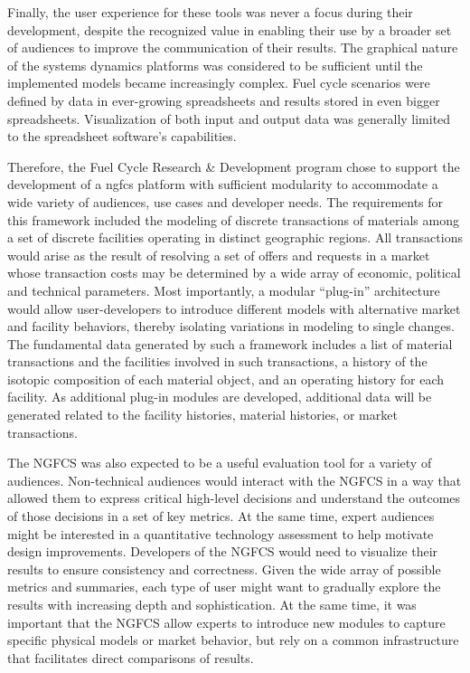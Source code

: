 Finally, the user experience for these tools was never a focus during their
development, despite the recognized value in enabling their use by a broader
set of audiences to improve the communication of their results.  The graphical
nature of the systems dynamics platforms was considered to be sufficient until
the implemented models became increasingly complex.  Fuel cycle scenarios were
defined by data in ever-growing spreadsheets and results stored in even bigger
spreadsheets.  Visualization of both input and output data was generally
limited to the spreadsheet software's capabilities.

Therefore, the Fuel Cycle Research \& Development program chose to support the
development of a \gls{ngfcs} platform with sufficient modularity to
accommodate a wide variety of audiences, use cases and developer needs. The
requirements for this framework included the modeling of discrete transactions
of materials among a set of discrete facilities operating in distinct
geographic regions. All transactions would arise as the result of resolving a
set of offers and requests in a market whose transaction costs may be
determined by a wide array of economic, political and technical
parameters. Most importantly, a modular “plug-in” architecture would allow
user-developers to introduce different models with alternative market and
facility behaviors, thereby isolating variations in modeling to single
changes. The fundamental data generated by such a framework includes a list of
material transactions and the facilities involved in such transactions, a
history of the isotopic composition of each material object, and an operating
history for each facility. As additional plug-in modules are developed,
additional data will be generated related to the facility histories, material
histories, or market transactions.

The NGFCS was also expected to be a useful evaluation tool for a variety of
audiences.  Non-technical audiences would interact with the NGFCS in a way
that allowed them to express critical high-level decisions and understand the
outcomes of those decisions in a set of key metrics. At the same time, expert
audiences might be interested in a quantitative technology assessment to help
motivate design improvements. Developers of the NGFCS would need to visualize
their results to ensure consistency and correctness. Given the wide array of
possible metrics and summaries, each type of user might want to gradually
explore the results with increasing depth and sophistication. At the same
time, it was important that the NGFCS allow experts to introduce new modules
to capture specific physical models or market behavior, but rely on a common
infrastructure that facilitates direct comparisons of results.

